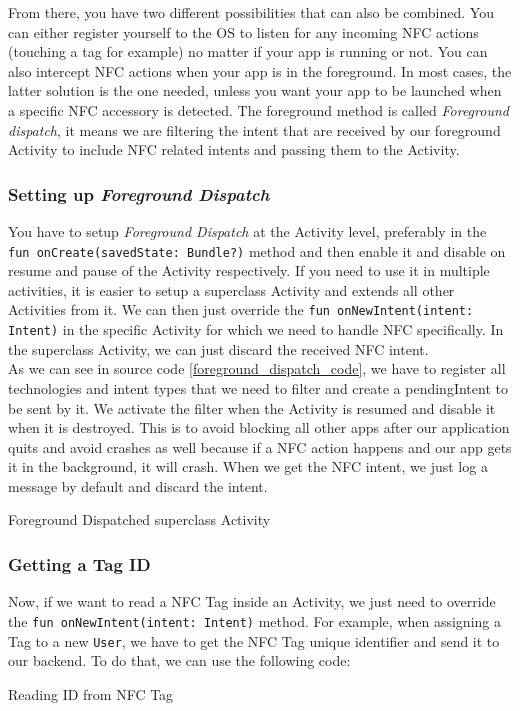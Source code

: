 \documentclass[11pt,a4paper]{report}
\newenvironment{code}{\captionsetup{type=listing}}{}
\begin{document}
From there, you have two different possibilities that can also be combined. You can either register yourself to the OS to listen for any incoming NFC actions (touching a tag for example) no matter if your app is running or not. You can also intercept NFC actions when your app is in the foreground. In most cases, the latter solution is the one needed, unless you want your app to be launched when a specific NFC accessory is detected. The foreground method is called \emph{Foreground dispatch}, it means we are filtering the intent that are received by our foreground Activity to include NFC related intents and passing them to the Activity.

\subsubsection{Setting up \emph{Foreground Dispatch}}
You have to setup \emph{Foreground Dispatch}\cite{android:doc:nfc_foregroundDispatch} at the Activity level, preferably in the \texttt{fun onCreate(savedState: Bundle?)} method and then enable it and disable on resume and pause of the Activity respectively. If you need to use it in multiple activities, it is easier to setup a superclass Activity and extends all other Activities from it. We can then just override the \texttt{fun onNewIntent(intent: Intent)} in the specific Activity for which we need to handle NFC specifically. In the superclass Activity, we can just discard the received NFC intent.\\

As we can see in source code \ref{foreground_dispatch_code}, we have to register all technologies and intent types that we need to filter and create a pendingIntent to be sent by it. We activate the filter when the Activity is resumed and disable it when it is destroyed. This is to avoid blocking all other apps after our application quits and avoid crashes as well because if a NFC action happens and our app gets it in the background, it will crash. When we get the NFC intent, we just log a message by default and discard the intent.

\begin{code}
	\caption{Foreground Dispatched superclass Activity}
	\label{foreground_dispatch_code}
\end{code}
\subsubsection{Getting a Tag ID}
Now, if we want to read a NFC Tag inside an Activity, we just need to override the \texttt{fun onNewIntent(intent: Intent)} method. For example, when assigning a Tag to a new \verb+User+, we have to get the NFC Tag unique identifier and send it to our backend. To do that, we can use the following code:
\begin{code}
	\caption{Reading ID from NFC Tag}
\end{code}
\end{document}
